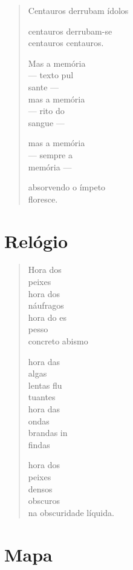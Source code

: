 \begin{verse}
Centauros derrubam ídolos

centauros derrubam-se\\
centauros centauros.

Mas a memória\\
--- texto pul\\
\qquad\qquad sante ---\\
\quad mas a memória\\
--- rito do\\
\quad\quad sangue ---

mas a memória\\
--- sempre a\\
\qquad\qquad memória ---

absorvendo o ímpeto\\
floresce.
\end{verse}

\chapter{Relógio}

\begin{verse}
Hora dos\\
peixes\\
hora dos\\
náufragos\\
hora do es\\
pesso\\
concreto abismo

hora das\\
algas\\
lentas flu\\
tuantes\\
hora das\\
ondas\\
brandas in\\
findas

hora dos\\
peixes\\
densos\\
obscuros\\
na obscuridade líquida.
\end{verse}

\chapter{Mapa}

